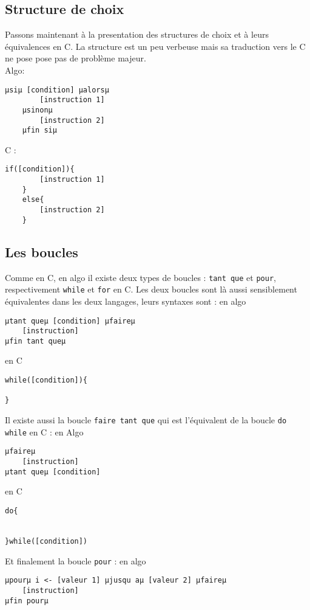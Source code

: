 \subsection{Structure de choix}

Passons maintenant à la presentation des structures de choix et à leurs
équivalences en C. La structure est un peu verbeuse mais sa traduction vers le C
ne pose pose pas de problème majeur.\\
Algo:
\begin{lstlisting}[style=base]
	µsiµ [condition] µalorsµ
		[instruction 1]
	µsinonµ 
		[instruction 2]
	µfin siµ
\end{lstlisting}

\noindent C :

\begin{lstlisting}[style=base]	
	if([condition]){
		[instruction 1]
	}
	else{
		[instruction 2]
	}
\end{lstlisting}

\subsection{Les boucles}

Comme en C, en algo il existe deux types de boucles : \texttt{tant que} et
\texttt{pour}, respectivement \texttt{while} et \texttt{for} en C. Les deux
boucles sont là aussi sensiblement équivalentes dans les deux langages, leurs syntaxes sont :
en algo
\begin{lstlisting}[style=base]
µtant queµ [condition] µfaireµ
	[instruction]
µfin tant queµ
\end{lstlisting}

en C
\begin{lstlisting}[style=base]
while([condition]){

}
\end{lstlisting}

Il existe aussi la boucle \texttt{faire tant que} qui est l'équivalent de la
boucle \texttt{do while} en C :
en Algo
\begin{lstlisting}[style=base]
µfaireµ 
	[instruction]
µtant queµ [condition]
\end{lstlisting}
en C
\begin{lstlisting}[style=base]
do{


}while([condition])
\end{lstlisting}

Et finalement la boucle \texttt{pour} :
en algo
\begin{lstlisting}[style=base]
µpourµ i <- [valeur 1] µjusqu aµ [valeur 2] µfaireµ
	[instruction]
µfin pourµ
\end{lstlisting}

